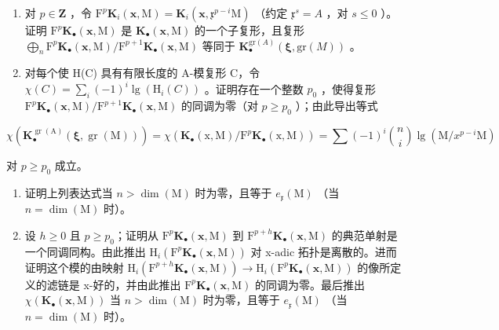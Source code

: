 \begin{enumerate}
\def\labelenumi{\alph{enumi})}
\item
  对 \(p \in \mathbf{Z}\) ，令 \(\mathrm{F}^p\mathbf{K}_i(\mathbf{x},\mathrm{M}) = \mathbf{K}_i(\mathbf{x},\mathfrak{x}^{p - i}\mathrm{M})\) （约定 \(\mathfrak{x}^s = A\) ，对 \(s \leqslant 0\) ）。证明 \(\mathrm{F}^p\mathbf{K}_{\bullet}(\mathbf{x},\mathrm{M})\) 是 \(\mathbf{K}_{\bullet}(\mathbf{x},\mathrm{M})\) 的一个子复形，且复形 \(\bigoplus_{n}\mathrm{F}^p\mathbf{K}_{\bullet}(\mathbf{x},\mathrm{M}) / \mathrm{F}^{p + 1}\mathbf{K}_{\bullet}(\mathbf{x},\mathrm{M})\) 等同于 \(\mathbf{K}_{\bullet}^{\mathrm{gr}(A)}(\boldsymbol {\xi},\mathrm{gr}(M))\) 。
\item
  对每个使 H(C) 具有有限长度的 A-模复形 C，令 \(\chi(C) = \sum_{i}(-1)^{i}\lg(\mathrm{H}_{i}(C))\) 。证明存在一个整数 \(p_0\) ，使得复形 \(\mathrm{F}^{p}\mathbf{K}_{\bullet}(\mathbf{x},\mathrm{M}) / \mathrm{F}^{p + 1}\mathbf{K}_{\bullet}(\mathbf{x},\mathrm{M})\) 的同调为零（对 \(p\geqslant p_0\) ）；由此导出等式
\end{enumerate}

\[
\chi \left(\mathbf {K} _ {\bullet} ^ {\operatorname{gr} (\mathrm{A})} (\boldsymbol {\xi}, \operatorname{gr} (\mathrm{M}))\right) = \chi \left(\mathbf {K} _ {\bullet} (\mathrm{x}, \mathrm{M}) / \mathrm{F} ^ {p} \mathbf {K} _ {\bullet} (\mathrm{x}, \mathrm{M})\right) = \sum (- 1) ^ {i} \binom {n} {i} \lg (\mathrm{M} / x ^ {p - i} \mathrm{M})
\]

对 \(p \geqslant p_0\) 成立。

\begin{enumerate}
\def\labelenumi{\alph{enumi})}
\setcounter{enumi}{2}
\item
  证明上列表达式当 \(n > \dim(\mathrm{M})\) 时为零，且等于 \(e_{\mathfrak{x}}(\mathrm{M})\) （当 \(n = \dim(\mathrm{M})\) 时）。
\item
  设 \(h \geqslant 0\) 且 \(p \geqslant p_{0}\)；证明从 \(\mathrm{F}^{p}\mathbf{K}_{\bullet}(\mathbf{x},\mathrm{M})\) 到 \(\mathrm{F}^{p+h}\mathbf{K}_{\bullet}(\mathbf{x},\mathrm{M})\) 的典范单射是一个同调同构。由此推出 \(\mathrm{H}_{i}(\mathrm{F}^{p}\mathbf{K}_{\bullet}(\mathbf{x},\mathrm{M}))\) 对 x-adic 拓扑是离散的。进而证明这个模的由映射 \(\mathrm{H}_{i}(\mathrm{F}^{p+h}\mathbf{K}_{\bullet}(\mathbf{x},\mathrm{M})) \to \mathrm{H}_{i}(\mathrm{F}^{p}\mathbf{K}_{\bullet}(\mathbf{x},\mathrm{M}))\) 的像所定义的滤链是 x-好的，并由此推出 \(\mathrm{F}^{p}\mathbf{K}_{\bullet}(\mathbf{x},\mathrm{M})\) 的同调为零。最后推出 \(\chi(\mathbf{K}_{\bullet}(\mathbf{x},\mathrm{M}))\) 当 \(n > \dim(\mathrm{M})\) 时为零，且等于 \(e_{\mathfrak{x}}(\mathrm{M})\) （当 \(n = \dim(\mathrm{M})\) 时）。
\end{enumerate}

